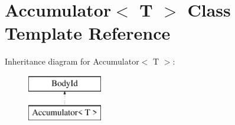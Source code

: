 \hypertarget{classAccumulator}{}\section{Accumulator$<$ T $>$ Class Template Reference}
\label{classAccumulator}
Inheritance diagram for Accumulator$<$ T $>$\+:\begin{figure}[H]
\begin{center}
\leavevmode
\includegraphics[height=2.000000cm]{classAccumulator}
\end{center}
\end{figure}
